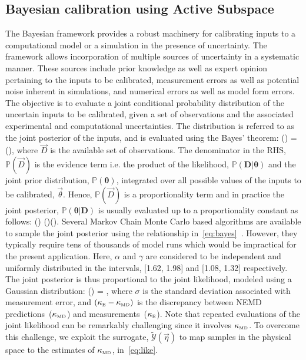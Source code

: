 \subsection{Bayesian calibration using Active Subspace}
\label{sub:ba}

The Bayesian framework provides a robust machinery for calibrating inputs to a computational model or
a simulation in the presence of uncertainty. The framework allows incorporation of multiple
sources of uncertainty in a systematic manner. These sources include prior knowledge as well as
expert opinion pertaining to the inputs to be calibrated, measurement errors as well as potential noise inherent
in simulations, and numerical errors as well as model form errors. The objective is to evaluate a joint
conditional probability distribution of the uncertain inputs to be calibrated, given a set of observations and the
associated experimental and computational uncertainties. The distribution is referred to as the joint posterior of
the inputs, and is evaluated using the Bayes' theorem:
%
\be
{}(\bm{\theta}\vert {}) = 
(\bm{\theta}),
\ee
%
where $\vec{D}$ is the available set of observations. 
The denominator in the RHS, $\mathbb{P}(\vec{D})$ is the evidence term i.e. the product of the likelihood, 
$\mathbb{P}(\bm{D}\vert\bm{\theta})$ and the joint prior distribution,
$\mathbb{P}(\bm{\theta})$, integrated over all possible values of the inputs to be calibrated, $\vec{\theta}$. 
Hence, $\mathbb{P}(\vec{D})$ is a proportionality term and in practice the joint posterior, 
$\mathbb{P}(\bm{\theta}\vert \bm{D})$ is usually evaluated up to a proportionality constant as follows:
%
\be
{}(\bm{\theta}\vert {}) \propto
{}(\vert\bm{\theta})(\bm{\theta}).
\label{eq:bayes}
\ee
%
Several Markov Chain Monte Carlo based algorithms are available to sample the joint posterior using the
relationship in~\eqref{eq:bayes}~\cite{Haario:2001, Haario:2006,Xu:2014}.
However, they typically require tens of thousands of model runs which would be
impractical for the present application. Here, $\alpha$ and $\gamma$ are considered to be independent and
uniformly distributed in the intervals, [1.62, 1.98] and [1.08, 1.32] respectively. The joint posterior is thus 
proportional to the joint likelihood, modeled using a Gaussian distribution:
%
\be
{}(\vert\bm{\theta}) = \exp{},
\label{eq:like}
\ee
%
\noindent where $\sigma$ is the standard deviation associated with measurement error, and
$(\kappa_{\tiny{\mbox{E}}} - \kappa_{\tiny{\mbox{MD}}})$ is the discrepancy between 
NEMD predictions~($\kappa_{\tiny{\mbox{MD}}}$) and measurements~($\kappa_{\tiny{\mbox{E}}}$). 
Note that repeated evaluations of the joint likelihood can be remarkably challenging since it involves 
$\kappa_{\tiny{\mbox{MD}}}$. To overcome this challenge, we exploit the surrogate, 
$\tilde{\mathcal{Y}}(\vec{\eta})$ to map samples in the physical space to the estimates of 
$\kappa_{\tiny{\mbox{MD}}}$, in~\eqref{eq:like}.

